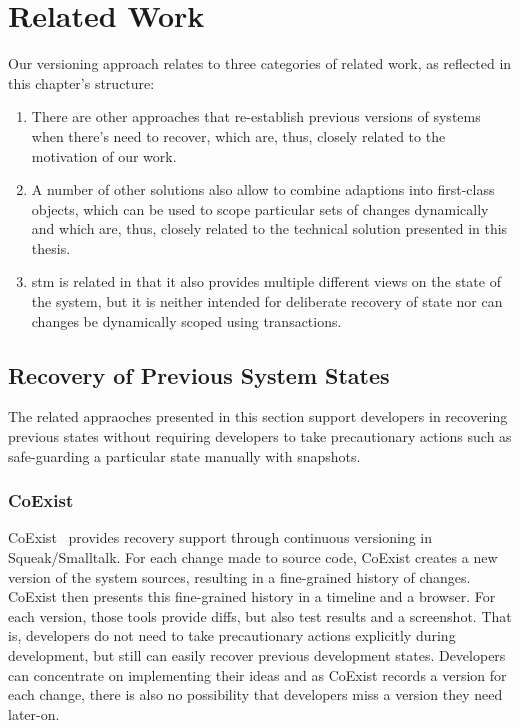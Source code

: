 \chapter{Related Work} \label{chapter:RELATED_WORK}

Our versioning approach relates to three categories of related work, as reflected in this chapter's structure:

\begin{enumerate}
    \item There are other approaches that re-establish previous versions of systems when there's need to recover, which are, thus, closely related to the motivation of our work.
    \item A number of other solutions also allow to combine adaptions into first-class objects, which can be used to scope particular sets of changes dynamically and which are, thus, closely related to the technical solution presented in this thesis.
    \item \ac{stm} is related in that it also provides multiple different views on the state of the system, but it is neither intended for deliberate recovery of state nor can changes be dynamically scoped using transactions.
\end{enumerate}


\section{Recovery of Previous System States}

The related appraoches presented in this section support developers in recovering previous states without requiring developers to take precautionary actions such as safe-guarding a particular state manually with snapshots.

\subsection{CoExist}

CoExist~\cite{Steinert2012COE} provides recovery support through continuous versioning in Squeak/Smalltalk.
For each change made to source code, CoExist creates a new version of the system sources, resulting in a fine-grained history of changes.
CoExist then presents this fine-grained history in a timeline and a browser.
For each version, those tools provide diffs, but also test results and a screenshot.
That is, developers do not need to take precautionary actions explicitly during development, but still can easily recover previous development states.
Developers can concentrate on implementing their ideas and as CoExist records a version for each change, there is also no possibility that developers miss a version they need later-on.

